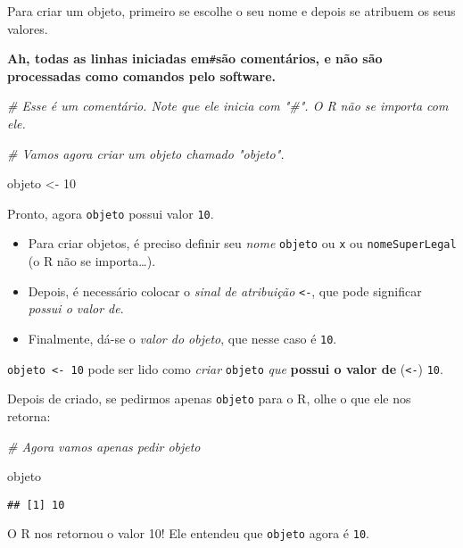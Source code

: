\documentclass[
]{article}
\newenvironment{Shaded}{\begin{snugshade}}{\end{snugshade}}
\newcommand{\CommentTok}[1]{\textcolor[rgb]{0.56,0.35,0.01}{\textit{#1}}}
\newcommand{\DecValTok}[1]{\textcolor[rgb]{0.00,0.00,0.81}{#1}}
\newcommand{\NormalTok}[1]{#1}
\newcommand{\StringTok}[1]{\textcolor[rgb]{0.31,0.60,0.02}{#1}}
\providecommand{\tightlist}{%
  \setlength{\itemsep}{0pt}\setlength{\parskip}{0pt}}
\begin{document}
Para criar um objeto, primeiro se escolhe o seu nome e depois se
atribuem os seus valores.

\textbf{Ah, todas as linhas iniciadas em}\texttt{\#}\textbf{são
comentários, e não são processadas como comandos pelo software.}

\begin{Shaded}
\begin{Highlighting}[]
\CommentTok{# Esse é um comentário. Note que ele inicia com "#". O R não se importa com ele.}

\CommentTok{# Vamos agora criar um objeto chamado "objeto".}

\NormalTok{objeto <-}\StringTok{ }\DecValTok{10}
\end{Highlighting}
\end{Shaded}

Pronto, agora \texttt{objeto} possui valor \texttt{10}.

\begin{itemize}
\tightlist
\item
  Para criar objetos, é preciso definir seu \emph{nome} \texttt{objeto}
  ou \texttt{x} ou \texttt{nomeSuperLegal} (o R não se importa\ldots).
\item
  Depois, é necessário colocar o \emph{sinal de atribuição}
  \texttt{\textless{}-}, que pode significar \emph{possui o valor de}.
\item
  Finalmente, dá-se o \emph{valor do objeto}, que nesse caso é
  \texttt{10}.
\end{itemize}

\texttt{objeto\ \textless{}-\ 10} pode ser lido como \emph{criar}
\texttt{objeto} \emph{que} \textbf{possui o valor de}
(\texttt{\textless{}-}) \texttt{10}.

Depois de criado, se pedirmos apenas \texttt{objeto} para o R, olhe o
que ele nos retorna:

\begin{Shaded}
\begin{Highlighting}[]
\CommentTok{# Agora vamos apenas pedir objeto}

\NormalTok{objeto}
\end{Highlighting}
\end{Shaded}

\begin{verbatim}
## [1] 10
\end{verbatim}

O R nos retornou o valor 10! Ele entendeu que \texttt{objeto} agora é
\texttt{10}.
\end{document}
